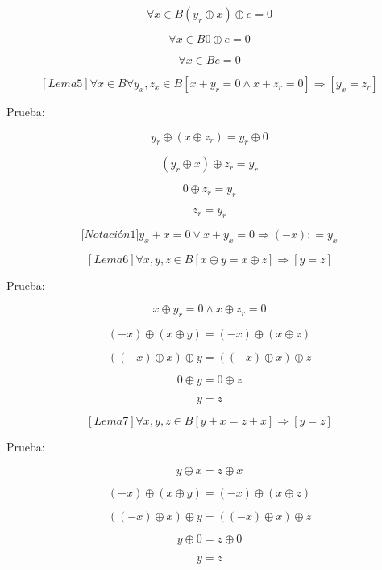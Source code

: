\begin{enumerate}
\begin{enumerate}
\begin{enumerate}
      \[\forall{x \in B}\left( {y_{r} \oplus x} \right) \oplus {e = 0}\]

      \[\forall{x \in B}0 \oplus {e = 0}\]

      \[\forall{x \in B}{e = 0}\]

      \[\left\lbrack {{Lema}5} \right\rbrack\forall{x \in B}\forall y_{x},{z_{x} \in B}\left\lbrack {{{x + y_{r}} = {{0 \land x} + z_{r}}} = 0} \right\rbrack\Rightarrow\left\lbrack {y_{x} = z_{r}} \right\rbrack\]

      Prueba:

      \[y_{r} \oplus {\left( {x \oplus z_{r}} \right) = y_{r}} \oplus 0\]

      \[\left( {y_{r} \oplus x} \right) \oplus {z_{r} = y_{r}}\]

      \[0 \oplus {z_{r} = y_{r}}\]

      \[z_{r} = y_{r}\]

      \[{\lbrack{{Notación}1}\rbrack}{{{y_{x} + x} = {{0 \vee x} + y_{x}}} = 0}\Rightarrow\left( {- x} \right){: = y_{x}}\]

      \[\left\lbrack {{Lema}6} \right\rbrack\forall x,y,{z \in B}\left\lbrack {x \oplus {y = x} \oplus z} \right\rbrack\Rightarrow\left\lbrack {y = z} \right\rbrack\]

      Prueba:

      \[x \oplus {y_{r} = {0 \land x}} \oplus {z_{r} = 0}\]

      \[{({- x})} \oplus {{({x \oplus y})} = {({- x})}} \oplus {({x \oplus z})}\]

      \[\left( {{({- x})} \oplus x} \right) \oplus {y = \left( {{({- x})} \oplus x} \right)} \oplus z\]

      \[0 \oplus {y = 0} \oplus z\]

      \[y = z\]

      \[\left\lbrack {{Lema}7} \right\rbrack\forall x,y,{z \in B}\left\lbrack {{y + x} = {z + x}} \right\rbrack\Rightarrow\left\lbrack {y = z} \right\rbrack\]

      Prueba:

      \[y \oplus {x = z} \oplus x\]

      \[{({- x})} \oplus {{({x \oplus y})} = {({- x})}} \oplus {({x \oplus z})}\]

      \[\left( {{({- x})} \oplus x} \right) \oplus {y = \left( {{({- x})} \oplus x} \right)} \oplus z\]

      \[y \oplus {0 = z} \oplus 0\]

      \[y = z\]


\end{enumerate}
\end{enumerate}
\end{enumerate}
